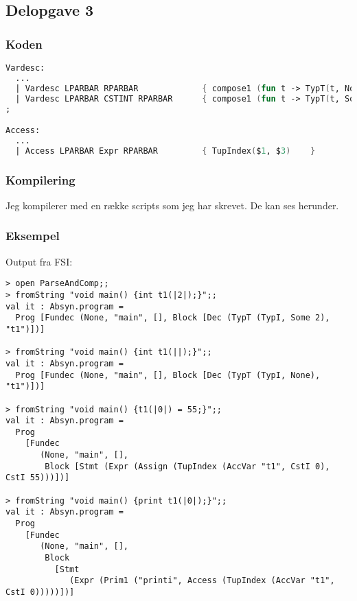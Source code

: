\subsection{Delopgave 3}\label{ass:3-3}
\subsubsection{Koden}
\begin{lstlisting}[language=fsharp]
Vardesc: 
  ...
  | Vardesc LPARBAR RPARBAR             { compose1 (fun t -> TypT(t, None)) $1    }
  | Vardesc LPARBAR CSTINT RPARBAR      { compose1 (fun t -> TypT(t, Some $3)) $1 }
;

Access:
  ...
  | Access LPARBAR Expr RPARBAR         { TupIndex($1, $3)    }   
\end{lstlisting}

\subsubsection{Kompilering}
Jeg kompilerer med en række scripts som jeg har skrevet. De kan ses herunder.









\subsubsection{Eksempel}
Output fra FSI:
\begin{lstlisting}
> open ParseAndComp;;
> fromString "void main() {int t1(|2|);}";;
val it : Absyn.program =
  Prog [Fundec (None, "main", [], Block [Dec (TypT (TypI, Some 2), "t1")])]

> fromString "void main() {int t1(||);}";;
val it : Absyn.program =
  Prog [Fundec (None, "main", [], Block [Dec (TypT (TypI, None), "t1")])]

> fromString "void main() {t1(|0|) = 55;}";;
val it : Absyn.program =
  Prog
    [Fundec
       (None, "main", [],
        Block [Stmt (Expr (Assign (TupIndex (AccVar "t1", CstI 0), CstI 55)))])]

> fromString "void main() {print t1(|0|);}";;
val it : Absyn.program =
  Prog
    [Fundec
       (None, "main", [],
        Block
          [Stmt
             (Expr (Prim1 ("printi", Access (TupIndex (AccVar "t1", CstI 0)))))])]

\end{lstlisting}


